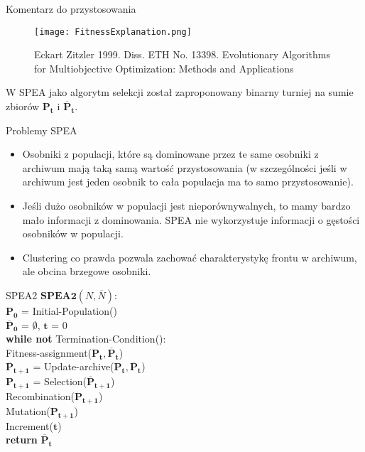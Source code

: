 \documentclass{beamer}
\begin{document}
\begin{frame}{Komentarz do przystosowania}
\begin{figure}[htp]
    \centering
    \texttt{[image: FitnessExplanation.png]}
    \caption{Eckart Zitzler 1999. Diss. ETH No. 13398. Evolutionary Algorithms for Multiobjective Optimization: Methods and Applications}
\end{figure}
W SPEA jako algorytm selekcji został zaproponowany binarny turniej na sumie zbiorów $\boldsymbol{{P}_t}$ i $\boldsymbol{\overline{P}_t}$.
\end{frame}


\begin{frame}{Problemy SPEA}
\begin{itemize}
    \item Osobniki z populacji, które są dominowane przez te same osobniki z archiwum mają taką samą wartość przystosowania (w szczególności jeśli w archiwum jest jeden osobnik to cała populacja ma to samo przystosowanie).
    \item Jeśli dużo osobników w populacji jest nieporównywalnych, to mamy bardzo mało informacji z dominowania. SPEA nie wykorzystuje informacji o gęstości osobników w populacji.
    \item Clustering co prawda pozwala zachować charakterystykę frontu w archiwum, ale obcina brzegowe osobniki.
\end{itemize}
\end{frame}


\begin{frame}{SPEA2}
$\boldsymbol{SPEA2}(N,\overline{N})$:\smallskip\\
$\boldsymbol{P_0}$ = Initial-Population()\\
$\boldsymbol{\overline{P}_0}$ = $\emptyset$, $\boldsymbol{t}$ = 0\\
\textbf{while not} Termination-Condition():\\
\quad \quad Fitness-assignment($\boldsymbol{P_t}, \boldsymbol{\overline{P}_t}$) \\
\quad \quad $\boldsymbol{\overline{P}_{t+1}}$ = Update-archive($\boldsymbol{P_t}, \boldsymbol{\overline{P}_t}$)\\
\quad \quad $\boldsymbol{{P}_{t+1}}$ = Selection($\boldsymbol{\overline{P}_{t+1}}$)\\
\quad \quad Recombination($\boldsymbol{{P}_{t+1}}$)\\
\quad \quad Mutation($\boldsymbol{{P}_{t+1}}$)\\
\quad \quad Increment($\boldsymbol{t}$)\\
\textbf{return} $\boldsymbol{\overline{P}_t}$\\
\end{frame}
\end{document}
